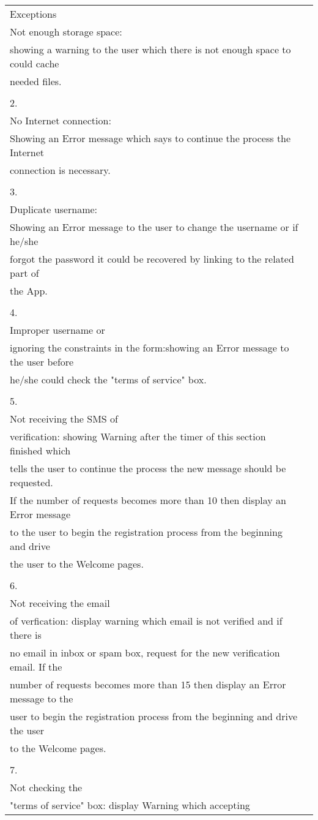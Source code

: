 \begin{table}[]
\begin{tabular}{ll}
Exceptions       & \begin{tabular}[c]{@{}l@{}}1.    \\   Not enough storage space:\\   showing a warning to the user which there is not enough space to could cache\\   needed files.\\    \\   2.    \\   No Internet connection:\\   Showing an Error message which says to continue the process the Internet\\   connection is necessary.\\    \\   3.    \\   Duplicate username:\\   Showing an Error message to the user to change the username or if he/she\\   forgot the password it could be recovered by linking to the related part of\\   the App.\\    \\   4.    \\   Improper username or\\   ignoring the constraints in the form:showing an Error message to the user before\\   he/she could check the "terms of service" box.\\    \\   5.    \\   Not receiving the SMS of\\   verification: showing Warning after the timer of this section finished which\\   tells the user to continue the process the new message should be requested.\\   If the number of requests becomes more than 10 then display an Error message\\   to the user to begin the registration process from the beginning and drive\\   the user to the Welcome pages.\\    \\   6.    \\   Not receiving the email\\   of verfication: display warning which email is not verified and if there is\\   no email in inbox or spam box, request for the new verification email. If the\\   number of requests becomes more than 15 then display an Error message to the\\   user to begin the registration process from the beginning and drive the user\\   to the Welcome pages.\\    \\   7.    \\   Not checking the\\   "terms of service" box: display Warning which accepting 
\end{tabular}
\end{table}
